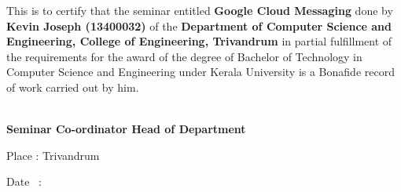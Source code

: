 \vspace{.6cm}
\begin{Large}
\begin{spacing}{1.5}
\hspace{1.5cm} This  is  to certify that the seminar entitled {\bf Google Cloud Messaging} done by {\bf  Kevin Joseph (13400032)} of the {\bf Department of Computer Science and Engineering, College of Engineering, Trivandrum} in partial fulfillment of the requirements for the award of the degree of Bachelor of Technology in Computer Science and Engineering under Kerala University is a Bonafide record of work carried out by him.
\vspace{2cm}
\end{spacing}

\bf\Large \hspace{.3cm}\hspace{1.7cm} \hspace{3cm} \\
\bf\Large \hspace{1cm}Seminar Co-ordinator    \hspace{4cm} Head of Department

\vspace{2cm}
\begin{spacing}{1.4}
\noindent Place : Trivandrum

\noindent Date \ : 
\end{spacing}
\end{Large}

